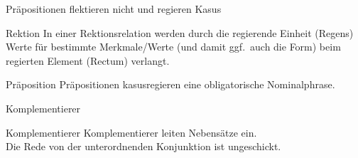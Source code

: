 \begin{frame}
  {Präpositionen flektieren nicht und regieren Kasus}
  \pause
  \begin{exe}
    \ex
    \begin{xlist}
      \pause
      \pause
      \pause
    \end{xlist}
  \end{exe}
  \pause
  \pause
  \pause
  \Zeile
  \begin{block}{Rektion}
    In einer Rektionsrelation werden durch die regierende Einheit (\alert{Regens}) Werte für bestimmte Merkmale\slash Werte (und damit ggf.\ auch die Form) beim regierten Element (\alert{Rectum}) verlangt.\\
  \end{block}
  \Zeile
  \pause
  \begin{block}{Präposition}
    Präpositionen kasusregieren eine obligatorische Nominalphrase.
  \end{block}
\end{frame}

\begin{frame}
  {Komplementierer}
  \pause
  \begin{exe}
    \ex
    \begin{xlist}
    \end{xlist}
  \end{exe}
  \Zeile
  \pause
  \pause
  \pause
  \pause
  \pause
  \pause
  \pause
  \pause
  \pause
  \pause
  \begin{block}{Komplementierer}
    Komplementierer leiten Nebensätze ein.\\
    Die Rede von der unterordnenden Konjunktion ist ungeschickt.
  \end{block}
\end{frame}

